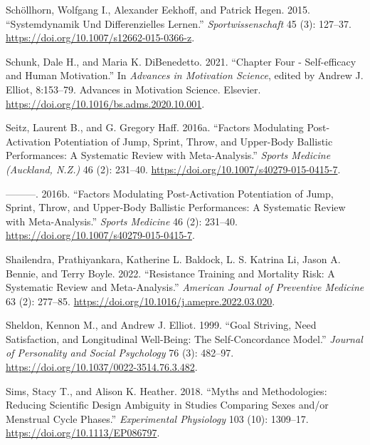 \documentclass[
  letterpaper,
  DIV=11,
  numbers=noendperiod]{scrreprt}
\newlength{\cslhangindent}
\newenvironment{CSLReferences}[2] %
 {\begin{list}{}{%
  \setlength{\itemindent}{0pt}
  \setlength{\leftmargin}{0pt}
  \setlength{\parsep}{0pt}
  \ifodd #1
   \setlength{\leftmargin}{\cslhangindent}
   \setlength{\itemindent}{-1\cslhangindent}
  \fi
  \setlength{\itemsep}{#2\baselineskip}}}
 {\end{list}}
\begin{document}
\begin{CSLReferences}{1}{0}
Schöllhorn, Wolfgang I., Alexander Eekhoff, and Patrick Hegen. 2015.
{``Systemdynamik Und Differenzielles {Lernen}.''}
\emph{Sportwissenschaft} 45 (3): 127--37.
\url{https://doi.org/10.1007/s12662-015-0366-z}.

Schunk, Dale H., and Maria K. DiBenedetto. 2021. {``Chapter {Four} -
{Self-efficacy} and Human Motivation.''} In \emph{Advances in
{Motivation Science}}, edited by Andrew J. Elliot, 8:153--79. Advances
in {Motivation Science}. Elsevier.
\url{https://doi.org/10.1016/bs.adms.2020.10.001}.

Seitz, Laurent B., and G. Gregory Haff. 2016a. {``Factors {Modulating
Post-Activation Potentiation} of {Jump}, {Sprint}, {Throw}, and
{Upper-Body Ballistic Performances}: {A Systematic Review} with
{Meta-Analysis}.''} \emph{Sports Medicine (Auckland, N.Z.)} 46 (2):
231--40. \url{https://doi.org/10.1007/s40279-015-0415-7}.

---------. 2016b. {``Factors {Modulating Post-Activation Potentiation}
of {Jump}, {Sprint}, {Throw}, and {Upper-Body Ballistic Performances}:
{A Systematic Review} with {Meta-Analysis}.''} \emph{Sports Medicine} 46
(2): 231--40. \url{https://doi.org/10.1007/s40279-015-0415-7}.

Shailendra, Prathiyankara, Katherine L. Baldock, L. S. Katrina Li, Jason
A. Bennie, and Terry Boyle. 2022. {``Resistance {Training} and
{Mortality Risk}: {A Systematic Review} and {Meta-Analysis}.''}
\emph{American Journal of Preventive Medicine} 63 (2): 277--85.
\url{https://doi.org/10.1016/j.amepre.2022.03.020}.

Sheldon, Kennon M., and Andrew J. Elliot. 1999. {``Goal Striving, Need
Satisfaction, and Longitudinal Well-Being: {The} Self-Concordance
Model.''} \emph{Journal of Personality and Social Psychology} 76 (3):
482--97. \url{https://doi.org/10.1037/0022-3514.76.3.482}.

Sims, Stacy T., and Alison K. Heather. 2018. {``Myths and
{Methodologies}: {Reducing} Scientific Design Ambiguity in Studies
Comparing Sexes and/or Menstrual Cycle Phases.''} \emph{Experimental
Physiology} 103 (10): 1309--17. \url{https://doi.org/10.1113/EP086797}.


\end{CSLReferences}
\end{document}

